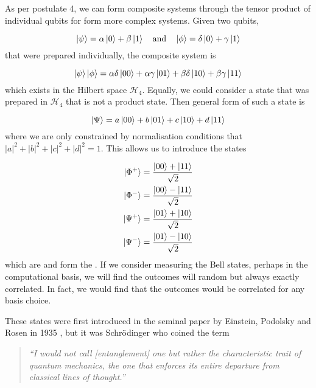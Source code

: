 As per postulate 4, we can form composite systems through the tensor product of individual qubits for form more complex systems. Given two qubits,

\begin{equation}
	\ket{\psi} = \alpha\ket{0} + \beta\ket{1} \quad \text{and} \quad \ket{\phi} = \delta\ket{0} + \gamma\ket{1}
\end{equation} 
that were prepared individually, the composite system is

\begin{equation}
	\ket{\psi}\ket{\phi} = \alpha\delta\ket{00} + \alpha\gamma\ket{01} + \beta\delta\ket{10} + \beta\gamma\ket{11}
\end{equation}
which exists in the Hilbert space $\mathcal{H}_4$. Equally, we could consider a state that was prepared in $\mathcal{H}_4$ that is not a product state. Then general form of such a state is

\begin{equation}
	\ket{\Psi} = a\ket{00} + b\ket{01} + c\ket{10} + d\ket{11}
\end{equation}
where we are only constrained by normalisation conditions that $|a|^2 + |b|^2 + |c|^2 + |d|^2 = 1$. This allows us to introduce the states

\begin{align}
	\label{eq:BellStateStart}
	\ket{\Phi^+} &= \frac{\ket{00} + \ket{11}}{\sqrt{2}}\\
	\ket{\Phi^-} &= \frac{\ket{00} - \ket{11}}{\sqrt{2}}\\
	\ket{\Psi^+} &= \frac{\ket{01} + \ket{10}}{\sqrt{2}}\\
	\ket{\Psi^-} &= \frac{\ket{01} - \ket{10}}{\sqrt{2}}
	\label{eq:BellStateEnd}
\end{align}
which are  and form the . If we consider measuring the Bell states, perhaps in the computational basis, we will find the outcomes will random but always exactly correlated. In fact, we would find that the outcomes would be correlated for any basis choice.

These states were first introduced in the seminal paper by Einstein, Podolsky and Rosen in 1935 \cite{einstein1935can}, but it was Schr\"{o}dinger who coined the term

\begin{quote}
\textit{``I would not call [entanglement] one but rather the characteristic trait of quantum mechanics, the one that enforces its entire departure from classical lines of thought.''}
\end{quote}


